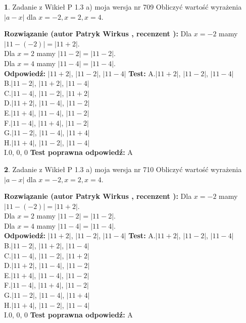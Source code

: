 \documentclass[12pt, a4paper]{article}
\theoremstyle{definition} %
\newtheorem{zad}{}
\newcommand{\zadStart}[1]{\begin{zad}#1\newline}
\newcommand{\zadStop}{\end{zad}}
\newcommand{\rozwStart}[2]{\noindent \textbf{Rozwiązanie (autor #1 , recenzent #2): }\newline}
\newcommand{\rozwStop}{\newline}
\newcommand{\odpStart}{\noindent \textbf{Odpowiedź:}\newline}
\newcommand{\odpStop}{\newline}
\newcommand{\testStart}{\noindent \textbf{Test:}\newline}
\newcommand{\testStop}{\newline}
\newcommand{\kluczStart}{\noindent \textbf{Test poprawna odpowiedź:}\newline}
\newcommand{\kluczStop}{\newline}
\begin{document}
\zadStart{Zadanie z Wikieł P 1.3 a) moja wersja nr 709}
Obliczyć wartość wyrażenia $|a - x|$ dla $x=-2,x=2,x=4$.
\zadStop
\rozwStart{Patryk Wirkus}{}
Dla $x = -2$ mamy $|11 - (-2)| = |11 + 2|$.\\
Dla $x = 2$ mamy $|11 - 2| = |11 - 2|$.\\
Dla $x = 4$ mamy $|11 - 4| = |11 - 4|$.\\
\rozwStop
\odpStart
$|11 + 2|$, $|11 - 2|$, $|11 - 4|$
\odpStop
\testStart
A.$|11 + 2|$, $|11 - 2|$, $|11 - 4|$\\
B.$|11 - 2|$, $|11 + 2|$, $|11 - 4|$\\
C.$|11 - 4|$, $|11 - 2|$, $|11 + 2|$\\
D.$|11 + 2|$, $|11 - 4|$, $|11 - 2|$\\
E.$|11 + 4|$, $|11 - 4|$, $|11 - 2|$\\
F.$|11 - 4|$, $|11 + 4|$, $|11 - 2|$\\
G.$|11 - 2|$, $|11 - 4|$, $|11 + 4|$\\
H.$|11 + 4|$, $|11 - 2|$, $|11 - 4|$\\
I.$0$, $0$, $0$
\testStop
\kluczStart
A
\kluczStop



\zadStart{Zadanie z Wikieł P 1.3 a) moja wersja nr 710}
Obliczyć wartość wyrażenia $|a - x|$ dla $x=-2,x=2,x=4$.
\zadStop
\rozwStart{Patryk Wirkus}{}
Dla $x = -2$ mamy $|11 - (-2)| = |11 + 2|$.\\
Dla $x = 2$ mamy $|11 - 2| = |11 - 2|$.\\
Dla $x = 4$ mamy $|11 - 4| = |11 - 4|$.\\
\rozwStop
\odpStart
$|11 + 2|$, $|11 - 2|$, $|11 - 4|$
\odpStop
\testStart
A.$|11 + 2|$, $|11 - 2|$, $|11 - 4|$\\
B.$|11 - 2|$, $|11 + 2|$, $|11 - 4|$\\
C.$|11 - 4|$, $|11 - 2|$, $|11 + 2|$\\
D.$|11 + 2|$, $|11 - 4|$, $|11 - 2|$\\
E.$|11 + 4|$, $|11 - 4|$, $|11 - 2|$\\
F.$|11 - 4|$, $|11 + 4|$, $|11 - 2|$\\
G.$|11 - 2|$, $|11 - 4|$, $|11 + 4|$\\
H.$|11 + 4|$, $|11 - 2|$, $|11 - 4|$\\
I.$0$, $0$, $0$
\testStop
\kluczStart
A
\kluczStop
\end{document}
